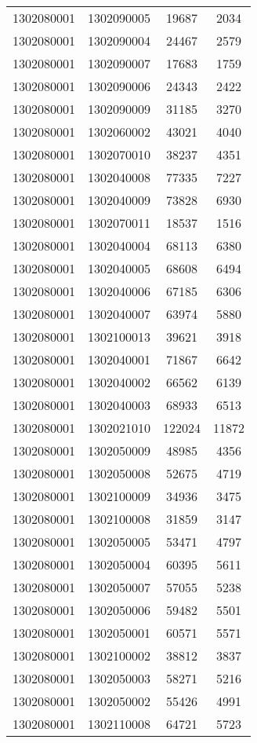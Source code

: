 \begin{longtable}[h]{llcc}
		1302080001 & 1302090005 & 19687 & 2034\\
		1302080001 & 1302090004 & 24467 & 2579\\
		1302080001 & 1302090007 & 17683 & 1759\\
		1302080001 & 1302090006 & 24343 & 2422\\
		1302080001 & 1302090009 & 31185 & 3270\\
		1302080001 & 1302060002 & 43021 & 4040\\
		1302080001 & 1302070010 & 38237 & 4351\\
		1302080001 & 1302040008 & 77335 & 7227\\
		1302080001 & 1302040009 & 73828 & 6930\\
		1302080001 & 1302070011 & 18537 & 1516\\
		1302080001 & 1302040004 & 68113 & 6380\\
		1302080001 & 1302040005 & 68608 & 6494\\
		1302080001 & 1302040006 & 67185 & 6306\\
		1302080001 & 1302040007 & 63974 & 5880\\
		1302080001 & 1302100013 & 39621 & 3918\\
		1302080001 & 1302040001 & 71867 & 6642\\
		1302080001 & 1302040002 & 66562 & 6139\\
		1302080001 & 1302040003 & 68933 & 6513\\
		1302080001 & 1302021010 & 122024 & 11872\\
		1302080001 & 1302050009 & 48985 & 4356\\
		1302080001 & 1302050008 & 52675 & 4719\\
		1302080001 & 1302100009 & 34936 & 3475\\
		1302080001 & 1302100008 & 31859 & 3147\\
		1302080001 & 1302050005 & 53471 & 4797\\
		1302080001 & 1302050004 & 60395 & 5611\\
		1302080001 & 1302050007 & 57055 & 5238\\
		1302080001 & 1302050006 & 59482 & 5501\\
		1302080001 & 1302050001 & 60571 & 5571\\
		1302080001 & 1302100002 & 38812 & 3837\\
		1302080001 & 1302050003 & 58271 & 5216\\
		1302080001 & 1302050002 & 55426 & 4991\\
		1302080001 & 1302110008 & 64721 & 5723\\

\end{longtable}
